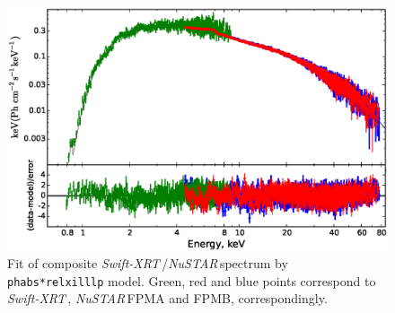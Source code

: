 \documentclass[a4paper,fleqn,usenatbib]{mnras}
\def\swiftx{{\em Swift-XRT\,}}
\def\nustar{{\em NuSTAR\,}}
\begin{document}
\begin{figure}
\centerline{\includegraphics[width=\linewidth]{spectrumfit_v02.eps}}
\caption{Fit of composite \swiftx/\nustar spectrum by \texttt{phabs*relxilllp} model. Green, red and blue points correspond to \swiftx, \nustar FPMA and FPMB, correspondingly.} 
\label{fig:spec}
\end{figure}  
\end{document}
